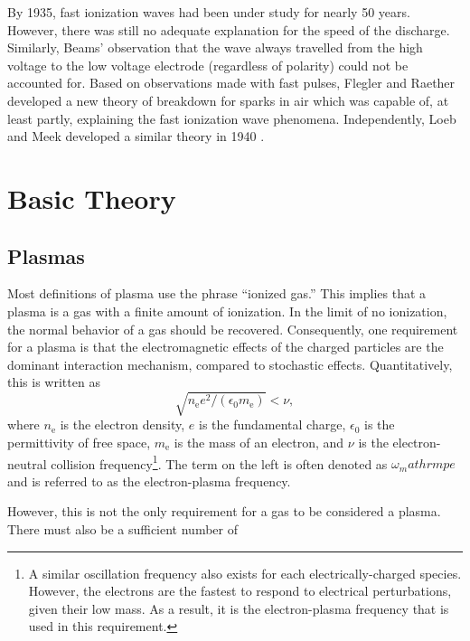 By 1935, fast ionization waves had been under study for nearly 50 years.
However, there was still no adequate explanation for the speed of the discharge.
Similarly, Beams' observation that the wave always travelled from the high
voltage to the low voltage electrode (regardless of polarity) could not be
accounted for. Based on observations made with fast pulses, Flegler and Raether
developed a new theory of breakdown for sparks in air \cite{Flegler1936}
which was capable of, at least partly, explaining the fast ionization wave
phenomena. Independently, Loeb and Meek developed a similar theory in 1940
\cite{Loeb1940}.


\section{Basic Theory}

\subsection{Plasmas}

Most definitions of plasma use the phrase ``ionized gas.'' This implies that a
plasma is a gas with a finite amount of ionization. In the limit of no
ionization, the normal behavior of a gas should be recovered. Consequently, one
requirement for a plasma is that the electromagnetic effects of the charged
particles are the dominant interaction mechanism, compared to stochastic
effects. Quantitatively, this is written as
\begin{equation}
  \sqrt{n_\mathrm{e} e^2 / (\epsilon_0 m_\mathrm{e})} < \nu,
\end{equation}
where $n_\mathrm{e}$ is the electron density, $e$ is the fundamental charge,
$\epsilon_0$ is the permittivity of free space, $m_\mathrm{e}$ is the mass of an
electron, and $\nu$ is the electron-neutral collision frequency\footnote{A
similar oscillation frequency also exists for each electrically-charged species.
However, the electrons are the fastest to respond to electrical perturbations,
given their low mass. As a result, it is the electron-plasma frequency that is
used in this requirement.}. The term on the left is often denoted as
$\omega_mathrm{pe}$ and is referred to as the electron-plasma frequency.

However, this is not the only requirement for a gas to be considered a plasma.
There must also be a sufficient number of


